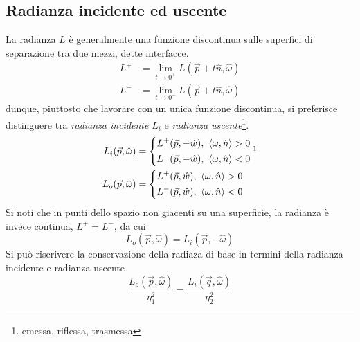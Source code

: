 \subsection{Radianza incidente ed uscente}
La radianza $L$ \`e generalmente una funzione discontinua sulle superfici di separazione tra due mezzi, dette interfacce.
\begin{align}
	L^+ &= \lim_{t\rightarrow 0^+} L(\vec{p}+t\hat{n},\hat{\omega})\\
	L^- &= \lim_{t\rightarrow 0^-} L(\vec{p}+t\hat{n},\hat{\omega})
\end{align}
dunque, piuttosto che lavorare con un unica funzione discontinua, si preferisce distinguere tra \textit{radianza incidente} $L_i$ e 
\textit{radianza uscente}\footnote{emessa, riflessa, trasmessa}.
\begin{align}\label{chapter1:radiometry:incidentOutgoingRadiances}
	L_i(\vec{p},\hat{\omega})&=\left\{
	\begin{aligned}
		L^+(\vec{p},-\hat{w}),\text{ }\langle\omega,\hat{n}\rangle>0\\
		L^-(\vec{p},-\hat{w}),\text{ }\langle\omega,\hat{n}\rangle<0
	\end{aligned}\right.\footnotemark{}\\
	L_o(\vec{p},\hat{\omega})&=\left\{
	\begin{aligned}
		L^+(\vec{p},\hat{w}),\text{ }\langle\omega,\hat{n}\rangle>0\\
		L^-(\vec{p},\hat{w}),\text{ }\langle\omega,\hat{n}\rangle<0
	\end{aligned}\right.
\end{align}
Si noti che in punti dello spazio non giacenti su una superficie, la radianza \`e invece continua, $L^+=L^-$, da cui
\begin{equation}
	L_o(\vec{p},\hat{\omega}) = L_i(\vec{p},-\hat{\omega})
\end{equation}
Si pu\`o riscrivere la conservazione della radiaza di base in termini della radianza incidente e radianza uscente
\begin{equation}
	\frac{L_o(\vec{p}, \hat{\omega})}{\eta^2_1} = \frac{L_i(\vec{q}, \hat{\omega})}{\eta^2_2}
\end{equation}
